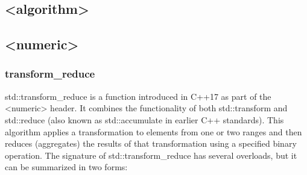 \documentclass{report}
\begin{document}

   \pagebreak 
   \subsection{<algorithm>}

   \pagebreak 
   \subsection{<numeric>}
   \bigbreak \noindent 
   \subsubsection{transform\_reduce}
   \bigbreak \noindent
   std::transform\_reduce is a function introduced in C++17 as part of the <numeric> header. It combines the functionality of both std::transform and std::reduce (also known as std::accumulate in earlier C++ standards). This algorithm applies a transformation to elements from one or two ranges and then reduces (aggregates) the results of that transformation using a specified binary operation.
   \bigbreak \noindent 
   The signature of std::transform\_reduce has several overloads, but it can be summarized in two forms:
   \bigbreak \noindent 
\end{document}
